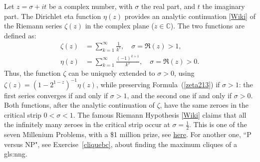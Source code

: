 \documentclass[10pt]{article}
\begin{document}
Let $z=\sigma+it$ be a complex number, with $\sigma$ the real part, and $t$ the imaginary part. The Dirichlet eta function $\eta(z)$ provides an analytic continuation [\href{https://en.wikipedia.org/wiki/Analytic_continuation}{Wiki}] of the Riemann  series $\zeta(z)$ in the complex plane ($z\in\mathbb{C}$). The two functions are defined as:
\begin{align}
\zeta(z) & = \sum_{k=1}^\infty \frac{1}{k^s}, \quad \sigma =\Re(z) > 1, \label{zeta213} \\
\eta(z) & = \sum_{k=1}^\infty \frac{(-1)^{k+1}}{k^s}, \quad \sigma =\Re(z) > 0. \label{zeta214}
\end{align}
Thus, the function $\zeta$ can be uniquely extended to $\sigma>0$, using $\zeta(z)=(1-2^{1-z})^{-1}\eta(z)$, while preserving
Formula~(\ref{zeta213}) if $\sigma>1$: the first series converges if and only if $\sigma>1$, and the second one if and only if $\sigma>0$.
Both functions, after the analytic continuation of $\zeta$, have the same zeroes in the critical strip $0<\sigma<1$. The famous Riemann Hypothesis [\href{https://en.wikipedia.org/wiki/Riemann_hypothesis}{Wiki}]
claims that all the infinitely many zeroes in the critical strip occur at $\sigma=\frac{1}{2}$. This is one of the seven Millenium Problems, with a \$1 million
prize, see \href{https://www.claymath.org/millennium-problems/riemann-hypothesis}{here}. For another one, ``P versus NP", see
Exercise~\ref{cliquebc}, about finding the maximum cliques of a \gls{gls:nng}.
\end{document}
